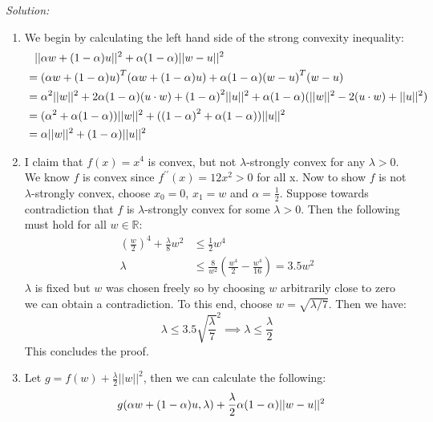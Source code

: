 \documentclass[
	10pt, %
	a4paper, %
	oneside, %
	headinclude,footinclude, %
	BCOR5mm, %
]{scrartcl}
\newenvironment{solution}
{\textit{Solution:}}
{}
\begin{document}
\begin{solution}
	\begin{enumerate}[label= (\alph*)]
		\item We begin by calculating the left hand side of the strong convexity inequality:
		      \begin{align*}
			       & \hphantom{=} ||\alpha w + (1-\alpha)u||^2 + \alpha(1-\alpha)||w-u||^2                                                       \\
			       & = {(\alpha w + (1-\alpha)u)}^T(\alpha w + (1-\alpha)u) + \alpha(1-\alpha){(w-u)}^T(w-u)                                     \\
			       & = \alpha^2||w||^2 + 2\alpha(1-\alpha)(u\cdot w) + {(1-\alpha)}^2||u||^2 + \alpha(1-\alpha)(||w||^2 - 2(u\cdot w) + ||u||^2) \\
			       & = (\alpha^2+\alpha(1-\alpha))||w||^2 + ({(1-\alpha)}^2 + \alpha(1-\alpha))||u||^2                                           \\
			       & = \alpha||w||^2 + (1-\alpha)||u||^2
		      \end{align*}
		\item I claim that $f(x) = x^4$ is convex, but not $\lambda$-strongly convex for any $\lambda>0$. We know $f$ is convex since $f^{\prime\prime}(x) = 12x^2 > 0$ for all x.
		      Now to show $f$ is not $\lambda$-strongly convex, choose $x_0=0$, $x_1=w$ and $\alpha=\frac{1}{2}$. Suppose towards contradiction that $f$ is $\lambda$-strongly convex for some $\lambda > 0$. Then the following must hold for all $w\in\mathbb{R}$:
		      \begin{align*}
			      {\left(\frac{w}{2}\right)}^4 + \frac{\lambda}{8}w^2 & \leq \frac{1}{2}w^4                                                    \\
			      \lambda                                             & \leq \frac{8}{w^2}\left(\frac{w^4}{2} - \frac{w^4}{16}\right) = 3.5w^2
		      \end{align*}
		      $\lambda$ is fixed but $w$ was chosen freely so by choosing $w$ arbitrarily close to zero we can obtain a contradiction. To this end, choose $w = \sqrt{\lambda/7}$. Then we have:
		      \[\lambda \leq 3.5\sqrt{\frac{\lambda}{7}}^2 \implies \lambda \leq \frac{\lambda}{2}\]
		      This concludes the proof.
		\item Let $g = f(w) + \frac{\lambda}{2}||w||^2$, then we can calculate the following: \begin{align*}
			       & \hphantom{=} g(\alpha w + (1-\alpha)u, \lambda) + \frac{\lambda}{2}\alpha(1-\alpha)||w-u||^2                              \\

\end{align*}
\end{enumerate}
\end{solution}
\end{document}
